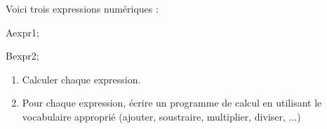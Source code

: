 \documentclass[exercice]{thedocument}%
\begin{document}
%
Voici trois expressions numériques :\par\bigskip
A\<expr1;\par\smallskip
B\<expr2;
\begin{enumerate}
    \item Calculer chaque expression.
    \item Pour chaque expression, écrire un programme de calcul en
    utilisant le vocabulaire approprié (ajouter, soustraire, multiplier,
    diviser, ...)
\end{enumerate}
\end{document}
